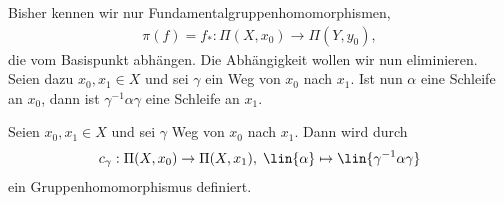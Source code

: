 Bisher kennen wir nur Fundamentalgruppenhomomorphismen,
\begin{align*}
\pi(f) = f_* : \Pi(X,x_0)\to \Pi(Y,y_0),
\end{align*} 
die vom Basispunkt abhängen. Die Abhängigkeit wollen wir nun eliminieren. Seien
dazu $x_0,x_1\in X$ und sei $\gamma$ ein Weg von $x_0$ nach $x_1$. Ist nun
$\alpha$ eine Schleife an $x_0$, dann ist
$\gamma^{-1}\alpha\gamma$ eine Schleife an $x_1$.

\begin{prop}
\label{prop:3.2.6}
Seien $x_0,x_1\in X$ und sei $\gamma$ Weg von $x_0$ nach $x_1$. Dann wird durch
\begin{align*}
c_\gamma: \Pi(X,x_0)\to \Pi(X,x_1),\; \lin{\alpha} \mapsto
\lin{\gamma^{-1}\alpha\gamma}
\end{align*} 
ein Gruppenhomomorphismus definiert.\fishhere
\end{prop}
